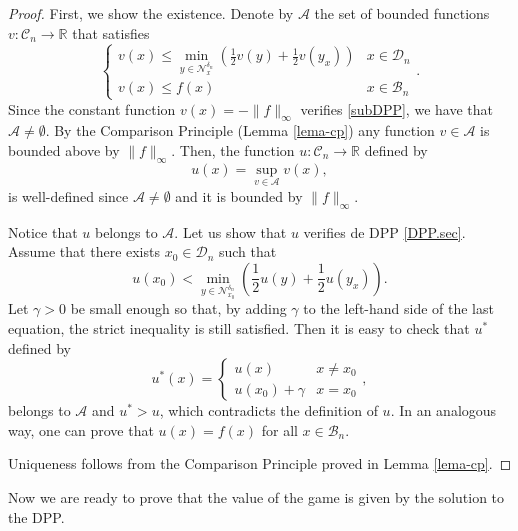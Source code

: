 \documentclass[11pt]{amsart}
\theoremstyle{definition}
\theoremstyle{remark}
\numberwithin{equation}{section}
\newcommand{\R}{{\mathbb R}}
\newcommand{\Domain}{\mathcal{D}}
\newcommand{\B}{\mathcal{B}}
\newcommand{\C}{{\mathcal C}}
\newcommand{\Nc}{{\mathcal N}}
\begin{document}
\begin{proof}
First, we show the existence. 
Denote by $\mathscr{A}$ the set of bounded functions $v \colon \C_n\rightarrow\R$ that satisfies
\begin{equation}
\label{subDPP}
\begin{cases}
\displaystyle  v(x)
\leq 
\min\limits_{y\in \Nc_x^{\delta_n}} 
\left(
\frac{1}{2} 
v(y) 
+
\frac{1}{2}
v(y_x) 
\right)
& x\in \Domain_n \\
v(x)
\leq 
f(x)
& x\in \B_n
\end{cases} 
.
\end{equation}
Since the constant function $v(x)=- \|f\|_{\infty}$ verifies \eqref{subDPP}, we have that $\mathscr{A}\neq \emptyset$. 
By the Comparison Principle (Lemma \ref{lema-cp}) any function $v\in \mathscr{A}$ is bounded above by  $\|f\|_{\infty}$.
Then, the function $u\colon \C_n \to \R$ defined by 
\begin{equation}
u(x)
=
\sup_{ v \in\mathscr{A} } v(x)
,
\end{equation}
is well-defined since $\mathscr{A} \neq \emptyset$ and it is bounded by $\|f\|_{\infty}$.

Notice that $u$ belongs to $\mathscr{A}$. 
Let us show that $u$ verifies de DPP \eqref{DPP.sec}. 
Assume that there exists $x_0\in \Domain_n$ such that 
\begin{equation}
\label{DPP.exist.aux}
u(x_0)
<
\min_{y\in \Nc_{x_0}^{\delta_n}} 
\left(
\frac{1}{2} 
u(y) 
+
\frac{1}{2}
u(y_x) 
\right)
.
\end{equation}
Let $\gamma>0$ be small enough so that, by adding $\gamma$ to the left-hand side of the last equation, the strict inequality is still satisfied.
Then it is easy to check that $u^*$ defined by
\begin{equation}
u^*(x)=
\begin{cases}
\displaystyle u(x) & x\neq x_0\\
\displaystyle u(x_0)+ \gamma & x=x_0
\end{cases}
,
\end{equation}
belongs to $\mathscr{A}$ and $u^*>u$, which contradicts the definition of $u$. 
In an analogous way, one can prove that $u(x)=f(x)$ for all $x\in\B_n$.

Uniqueness follows from the Comparison Principle proved in Lemma \ref{lema-cp}.
\end{proof}

Now we are ready to prove that the value of the game is given by the solution to the DPP.
	
\end{document}
